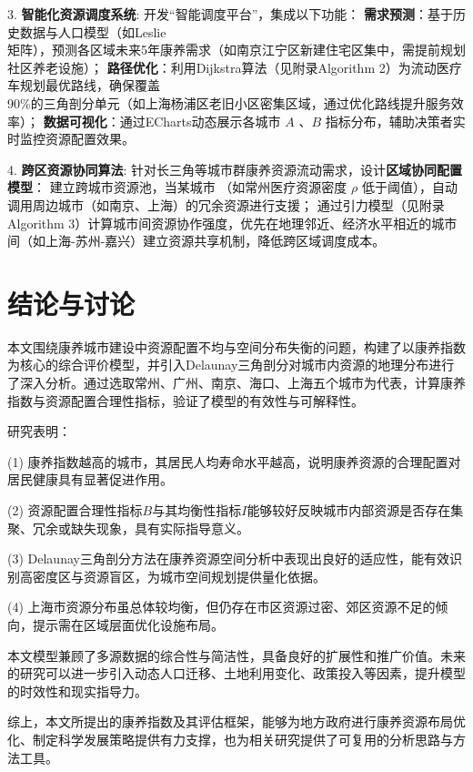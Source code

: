 \documentclass[12pt,a4paper]{article}
\begin{document}
3. \textbf{智能化资源调度系统}: 
   开发“智能调度平台”，集成以下功能：  
     \textbf{需求预测}：基于历史数据与人口模型（如Leslie\\矩阵），预测各区域未来5年康养需求（如南京江宁区新建住宅区集中，需提前规划社区养老设施）；  
     \textbf{路径优化}：利用Dijkstra算法（见附录Algorithm 2）为流动医疗车规划最优路线，确保覆盖\\90\%的三角剖分单元（如上海杨浦区老旧小区密集区域，通过优化路线提升服务效率）；  
     \textbf{数据可视化}：通过ECharts动态展示各城市 \( A \) 、\( B \) 指标分布，辅助决策者实时监控资源配置效果。  

4. \textbf{跨区资源协同算法}:
   针对长三角等城市群康养资源流动需求，设计\textbf{区域协同配置模型}：  
   建立跨城市资源池，当某城市
   \onecolumn
   （如常州医疗资源密度 \( \rho \) 低于阈值），自动调用周边城市（如南京、上海）的冗余资源进行支援；  
   通过引力模型（见附录Algorithm 3）计算城市间资源协作强度，优先在地理邻近、经济水平相近的城市间（如上海-苏州-嘉兴）建立资源共享机制，降低跨区域调度成本。

\section{结论与讨论}

本文围绕康养城市建设中资源配置不均与空间分布失衡的问题，构建了以康养指数为核心的综合评价模型，并引入Delaunay三角剖分对城市内资源的地理分布进行了深入分析。通过选取常州、广州、南京、海口、上海五个城市为代表，计算康养指数与资源配置合理性指标，验证了模型的有效性与可解释性。

研究表明：

(1) 康养指数越高的城市，其居民人均寿命水平越高，说明康养资源的合理配置对居民健康具有显著促进作用。

(2) 资源配置合理性指标$B$与其均衡性指标$I$能够较好反映城市内部资源是否存在集聚、冗余或缺失现象，具有实际指导意义。

(3) Delaunay三角剖分方法在康养资源空间分析中表现出良好的适应性，能有效识别高密度区与资源盲区，为城市空间规划提供量化依据。

(4) 上海市资源分布虽总体较均衡，但仍存在市区资源过密、郊区资源不足的倾向，提示需在区域层面优化设施布局。

本文模型兼顾了多源数据的综合性与简洁性，具备良好的扩展性和推广价值。未来的研究可以进一步引入动态人口迁移、土地利用变化、政策投入等因素，提升模型的时效性和现实指导力。

综上，本文所提出的康养指数及其评估框架，能够为地方政府进行康养资源布局优化、制定科学发展策略提供有力支撑，也为相关研究提供了可复用的分析思路与方法工具。
\end{document}
